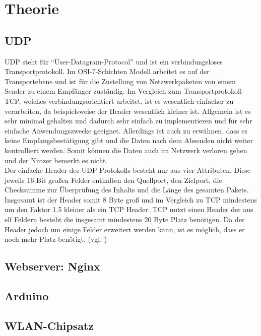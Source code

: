 \documentclass[ngerman]{scrartcl} %
\begin{document}
\newpage

\section{Theorie}        
\label{sec:Theorie-1}  

\subsection{UDP}
\label{sec:UDP-1}
UDP steht für ``User-Datagram-Protocol'' und ist ein verbindungsloses Transportprotokoll. Im OSI-7-Schichten Modell arbeitet es auf der Transportebene und ist für die Zustellung von Netzwerkpaketen von einem Sender zu einem Empfänger zuständig. Im Vergleich zum Transportprotokoll TCP, welches verbindungsorientiert arbeitet, ist es wesentlich einfacher zu verarbeiten, da beispielsweise der Header wesentlich kleiner ist. Allgemein ist es sehr minimal gehalten und dadurch sehr einfach zu implementieren und für sehr einfache Anwendungszwecke geeignet. Allerdings ist auch zu erwähnen, dass es keine Empfangsbestätigung gibt und die Daten nach dem Absenden nicht weiter kontrolliert werden. Somit können die Daten auch im Netzwerk verloren gehen und der Nutzer bemerkt es nicht. \\

Der einfache Header des UDP Protokolls besteht nur aus vier Attributen. Diese jeweils 16 Bit großen Felder enthalten den Quellport, den Zielport, die Checksumme zur Überprüfung des Inhalts und die Länge des gesamten Pakets. Insgesamt ist der Header somit 8 Byte groß und im Vergleich zu TCP mindestens um den Faktor 1.5 kleiner als ein TCP Header. TCP nutzt einen Header der aus elf Feldern besteht die insgesamt mindestens 20 Byte Platz benötigen. Da der Header jedoch um einige Felder erweitert werden kann, ist es möglich, dass er noch mehr Platz benötigt. (vgl. \cite{ElektronikKompendium.}\cite{.}\cite{.23.02.2016})
 
\subsection{Webserver: Nginx}
\label{sec:Webserver: Nginx-1} 
 
\subsection{Arduino}
\label{sec:Arduino-1} 

\subsection{WLAN-Chipsatz}
\label{sec:WLAN-CHipsatz-1} 
 
\end{document}
